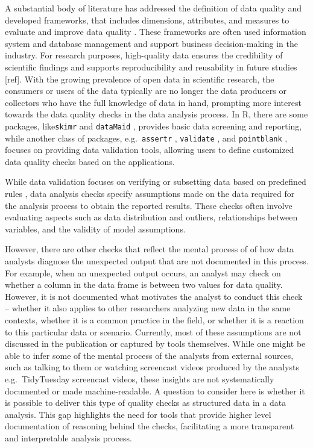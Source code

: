 \documentclass[
]{jds}
\begin{document}
A substantial body of literature has addressed the definition of data
quality \citep[more]{8642813} and developed frameworks, that includes
dimensions, attributes, and measures to evaluate and improve data
quality
\citep{cai2015challenges, wang1996beyond, 6204995, woodall2014classification}.
These frameworks are often used information system and database
management and support business decision-making in the industry. For
research purposes, high-quality data ensures the credibility of
scientific findings and supports reproducibility and reusability in
future studies {[}ref{]}. With the growing prevalence of open data in
scientific research, the consumers or users of the data typically are no
longer the data producers or collectors who have the full knowledge of
data in hand, prompting more interest towards the data quality checks in
the data analysis process. In R, there are some packages,
like\texttt{skimr} \citep{skimr} and \texttt{dataMaid} \citep{dataMaid},
provides basic data screening and reporting, while another class of
packages, e.g.~\texttt{assertr} \citep{assertr}, \texttt{validate}
\citep{validate}, and \texttt{pointblank} \citep{pointblank}, focuses on
providing data validation tools, allowing users to define customized
data quality checks based on the applications.

While data validation focuses on verifying or subsetting data based on
predefined rules \citep{zio2015methodology}, data analysis checks
specify assumptions made on the data required for the analysis process
to obtain the reported results. These checks often involve evaluating
aspects such as data distribution and outliers, relationships between
variables, and the validity of model assumptions.

However, there are other checks that reflect the mental process of of
how data analysts diagnose the unexpected output that are not documented
in this process. For example, when an unexpected output occurs, an
analyst may check on whether a column in the data frame is between two
values for data quality. However, it is not documented what motivates
the analyst to conduct this check -- whether it also applies to other
researchers analyzing new data in the same contexts, whether it is a
common practice in the field, or whether it is a reaction to this
particular data or scenario. Currently, most of these assumptions are
not discussed in the publication or captured by tools themselves. While
one might be able to infer some of the mental process of the analysts
from external sources, such as talking to them or watching screencast
videos produced by the analysts e.g.~TidyTuesday screencast videos,
these insights are not systematically documented or made
machine-readable. A question to consider here is whether it is possible
to deliver this type of quality checks as structured data in a data
analysis. This gap highlights the need for tools that provide higher
level documentation of reasoning behind the checks, facilitating a more
transparent and interpretable analysis process.
\end{document}
